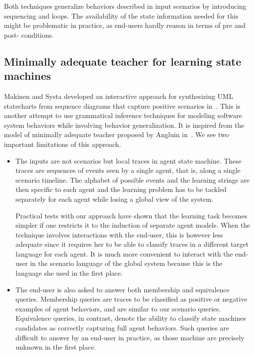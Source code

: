 Both techniques generalize behaviors described in input scenarios by introducing sequencing and loops. The availability of the state information needed for this might be problematic in practice, as end-users hardly reason in terms of pre and post- conditions.

\subsection*{Minimally adequate teacher for learning state machines}

Makinen and Systa developed an interactive approach for synthesizing UML statecharts from sequence diagrams that capture positive scenarios in~\cite{Makinen:2001}. This is another attempt to use grammatical inference techniques for modeling software system behaviors while involving behavior generalization. It is inspired from the model of minimally adequate teacher proposed by Angluin in~\cite{Angluin87b}. We see two important limitations of this approach.

\begin{itemize}

\item The inputs are not scenarios but local traces in agent state machine. These traces are sequences of events seen by a single agent, that is, along a single scenario timeline. The alphabet of possible events and the learning strings are then specific to each agent and the learning problem has to be tackled separately for each agent while losing a global view of the system. 

Practical tests with our approach have shown that the learning task becomes simpler if one restricts it to the induction of separate agent models. When the technique involves interactions with the end-user, this is however less adequate since it requires her to be able to classify traces in a different target language for each agent. It is much more convenient to interact with the end-user in the scenario language of the global system because this is the language she used in the first place.

\item The end-user is also asked to answer both membership and equivalence queries. Membership queries are traces to be classified as positive or negative examples of agent behaviors, and are similar to our scenario queries. Equivalence queries, in contrast, denote the ability to classify state machines candidates as correctly capturing full agent behaviors. Such queries are difficult to answer by an end-user in practice, as those machine are precisely unknown in the first place. 

\end{itemize}

